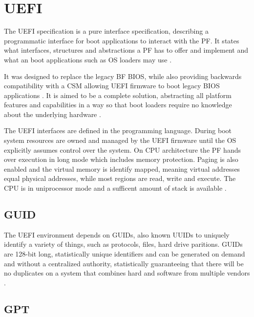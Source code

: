 
\section{\acf{UEFI}}

The \ac{UEFI} specification is a pure interface specification, describing a programmatic interface for boot applications to interact with the \ac{PF}.
It states what interfaces, structures and abstractions a \ac{PF} has to offer and implement and what an boot applications such as \ac{OS} loaders may use \cite{beyond-bios}.

It was designed to replace the legacy \acl{BF} \ac{BIOS}, while also providing backwards compatibility with a \acf{CSM} allowing \ac{UEFI} firmware to boot legacy \ac{BIOS} applications \cite{beyond-bios}.
It is aimed to be a complete solution, abstracting all platform features and capabilities in a way so that boot loaders require no knowledge about the underlying hardware \cite[1.3]{uefi-spec}.

The \ac{UEFI} interfaces are defined in the  programming language.
During boot system resources are owned and managed by the \ac{UEFI} firmware until the \ac{OS} explicitly assumes control over the system.
On  \ac{CPU} architecture the \ac{PF} hands over execution in  long mode which includes memory protection.
Paging is also enabled and the virtual memory is identify mapped, meaning virtual addresses equal physical addresses, while most regions are read, write and execute.
The \ac{CPU} is in uniprocessor mode and a sufficent amount of stack is available \cite[Section 2.3.4]{uefi-spec}.

\subsection{\acf{GUID}}

The \ac{UEFI} environment depends on \acp{GUID}, also known \acp{UUID} to uniquely identify a variety of things, such as protocols, files, hard drive paritions.
\acp{GUID} are 128-bit long, statistically unique identifiers and can be generated on demand and without a centralized authority, statistically guaranteeing that there will be no duplicates on a system that combines hard and software from multiple vendors \cite{rfc-4122}.

\subsection{\acf{GPT}}

